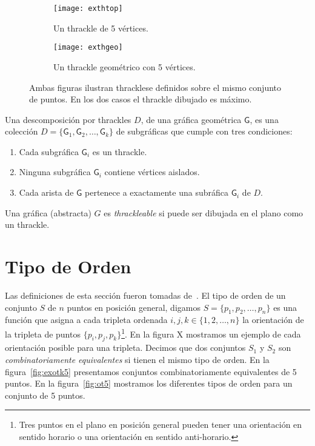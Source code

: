 \begin{figure}[htb]
  \centering
\begin{subfigure}[h]{.4\textwidth}
  \centering
  \texttt{[image: exthtop]}
  \caption{Un thrackle de 5 vértices.}
  \label{fig:exthtop}
\end{subfigure}\hfill%
\begin{subfigure}[h]{.4\textwidth}
  \centering
  \texttt{[image: exthgeo]}
  \caption{Un thrackle geométrico con 5 vértices.}
  \label{fig:exthgeo}
\end{subfigure}
\caption{Ambas figuras ilustran thracklese definidos sobre el mismo conjunto de
puntos. En los dos casos el thrackle dibujado es máximo.}
\label{fig:exthgeotop}
\end{figure}

Una descomposición por thrackles $D$, de una gráfica geométrica
$\mathsf{G}$, es una colección $D=\{\mathsf{G}_1,\mathsf{G}_2,\dots,\mathsf{G}_k\}$
de subgráficas que cumple con tres condiciones:
\begin{enumerate}
  \item Cada subgráfica $\mathsf{G}_i$ es un thrackle.
  \item Ninguna subgráfica $\mathsf{G}_i$ contiene vértices aislados.
  \item Cada arista de $\mathsf{G}$ pertenece a exactamente una subráfica $\mathsf{G}_i$ de $D$.
\end{enumerate}

Una gráfica (abstracta) $G$ es \emph{thrackleable} si puede ser dibujada en el plano como un thrackle.
\section{Tipo de Orden}
Las definiciones de esta sección fueron tomadas de~\cite{Aichholzer2002}.
El tipo de orden de un conjunto $S$ de $n$ puntos en posición general, digamos
$S=\{p_1,p_2,\dots,p_n\}$ es una función que asigna a cada tripleta ordenada
$i,j,k \in \{1,2,\dots,n\}$ la orientación de la tripleta de puntos $\{p_i,p_j,p_k\}$\footnote{
Tres puntos en el plano en posición general pueden tener una orientación en sentido horario
o una orientación en sentido anti-horario.}. En la figura X mostramos un ejemplo de
cada orientación posible para una tripleta.
Decimos que dos conjuntos $S_1$ y $S_2$ son \emph{combinatoriamente equivalentes} si
tienen el mismo tipo de orden. En la figura~\ref{fig:exotk5} presentamos conjuntos
combinatoriamente equivalentes de 5 puntos. En la figura~\ref{fig:ot5}
mostramos los diferentes tipos de orden para un conjunto de 5 puntos.

